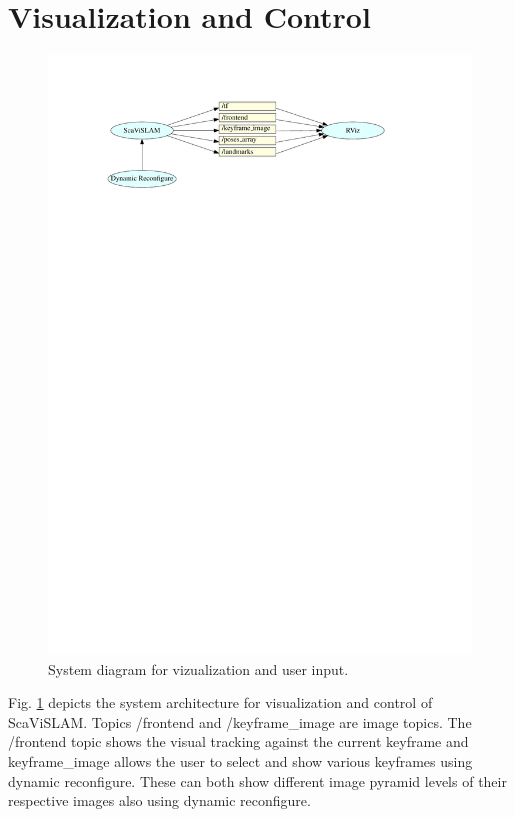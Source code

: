 \section{Visualization and Control}

\begin{figure}[h]
  \centering
    \includegraphics[width=1.0\textwidth]{chapters/images/visualization_architecture}
  \caption{System diagram for vizualization and user input.}
  \label{fig:visualization_architecture}
\end{figure}

Fig. \ref{fig:visualization_architecture} depicts the system architecture for visualization and control of ScaViSLAM.  Topics /frontend and /keyframe\_image are image topics.  The /frontend topic shows the visual tracking against the current keyframe and keyframe\_image allows the user to select and show various keyframes using dynamic reconfigure.  These can both show different image pyramid levels of their respective images also using dynamic reconfigure.


